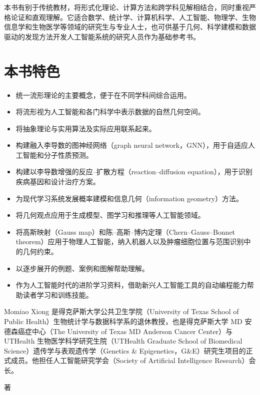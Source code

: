 本书有别于传统教材，将形式化理论、计算方法和跨学科见解相结合，同时重视严格论证和直观理解。它适合数学、统计学、计算机科学、人工智能、物理学、生物信息学和生物医学等领域的研究生与专业人士，也可供基于几何、科学建模和数据驱动的发现方法开发人工智能系统的研究人员作为基础参考书。

\section*{本书特色}

\begin{itemize}
  \item 统一流形理论的主要概念，便于在不同学科间综合运用。
  \item 将流形视为人工智能和各门科学中表示数据的自然几何空间。
  \item 将抽象理论与实用算法及实际应用联系起来。
  \item 构建融入李导数的图神经网络（graph neural network，GNN），用于自适应人工智能和分子性质预测。
  \item 构建以李导数增强的反应–扩散方程（reaction–diffusion equation），用于识别疾病基因和设计治疗方案。
  \item 为现代学习系统发展概率建模和信息几何（information geometry）方法。
  \item 将几何观点应用于生成模型、图学习和推理等人工智能领域。
  \item 将高斯映射（Gauss map）和陈–高斯–博内定理（Chern–Gauss–Bonnet theorem）应用于物理人工智能，纳入机器人以及肿瘤细胞位置与范围识别中的几何约束。
  \item 以逐步展开的例题、案例和图解帮助理解。
  \item 作为人工智能时代的进阶学习资料，借助新兴人工智能工具的自动编程能力帮助读者学习和训练技能。
\end{itemize}

Momiao Xiong 是得克萨斯大学公共卫生学院（University of Texas School of Public Health）生物统计学与数据科学系的退休教授，也是得克萨斯大学 MD 安德森癌症中心（The University of Texas MD Anderson Cancer Center）与 UTHealth 生物医学科学研究生院（UTHealth Graduate School of Biomedical Science）遗传学与表观遗传学（Genetics \& Epigenetics，G\&E）研究生项目的正式成员。他担任人工智能研究学会（Society of Artificial Intelligence Research）会长。

\clearpage
\thispagestyle{empty}
\null\vfill
\begin{center}
  {\heiti\bfseries\Huge \BookTitle\par}
  \vspace{1.2em}
  {\heiti\LARGE \BookSubtitle\par}
  \vspace{3em}
  {\Large \BookAuthor\quad 著\par}
\end{center}
\vfill\null\clearpage

